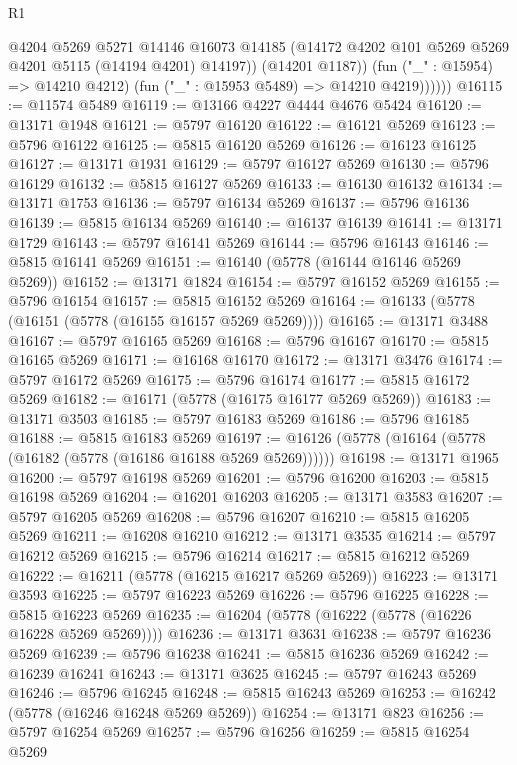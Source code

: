 \begin{lexlean}{R1}
\begin{coremodule}
                  @4204
                  @5269
                  @5271
                  @14146
                  @16073
                  @14185
                  (@14172 @4202 @101 @5269 @5269 @4201 @5115 (@14194 @4201) @14197))
                (@14201 @1187))
              (fun ("_" : @15954) => @14210 @4212)
              (fun ("_" : @15953 @5489) => @14210 @4219))))))
@16115 := @11574 @5489
@16119 := @13166 @4227 @4444 @4676 @5424
@16120 := @13171 @1948
@16121 := @5797 @16120
@16122 := @16121 @5269
@16123 := @5796 @16122
@16125 := @5815 @16120 @5269
@16126 := @16123 @16125
@16127 := @13171 @1931
@16129 := @5797 @16127 @5269
@16130 := @5796 @16129
@16132 := @5815 @16127 @5269
@16133 := @16130 @16132
@16134 := @13171 @1753
@16136 := @5797 @16134 @5269
@16137 := @5796 @16136
@16139 := @5815 @16134 @5269
@16140 := @16137 @16139
@16141 := @13171 @1729
@16143 := @5797 @16141 @5269
@16144 := @5796 @16143
@16146 := @5815 @16141 @5269
@16151 := @16140 (@5778 (@16144 @16146 @5269 @5269))
@16152 := @13171 @1824
@16154 := @5797 @16152 @5269
@16155 := @5796 @16154
@16157 := @5815 @16152 @5269
@16164 := @16133 (@5778 (@16151 (@5778 (@16155 @16157 @5269 @5269))))
@16165 := @13171 @3488
@16167 := @5797 @16165 @5269
@16168 := @5796 @16167
@16170 := @5815 @16165 @5269
@16171 := @16168 @16170
@16172 := @13171 @3476
@16174 := @5797 @16172 @5269
@16175 := @5796 @16174
@16177 := @5815 @16172 @5269
@16182 := @16171 (@5778 (@16175 @16177 @5269 @5269))
@16183 := @13171 @3503
@16185 := @5797 @16183 @5269
@16186 := @5796 @16185
@16188 := @5815 @16183 @5269
@16197 := @16126 (@5778 (@16164 (@5778 (@16182 (@5778 (@16186 @16188 @5269 @5269))))))
@16198 := @13171 @1965
@16200 := @5797 @16198 @5269
@16201 := @5796 @16200
@16203 := @5815 @16198 @5269
@16204 := @16201 @16203
@16205 := @13171 @3583
@16207 := @5797 @16205 @5269
@16208 := @5796 @16207
@16210 := @5815 @16205 @5269
@16211 := @16208 @16210
@16212 := @13171 @3535
@16214 := @5797 @16212 @5269
@16215 := @5796 @16214
@16217 := @5815 @16212 @5269
@16222 := @16211 (@5778 (@16215 @16217 @5269 @5269))
@16223 := @13171 @3593
@16225 := @5797 @16223 @5269
@16226 := @5796 @16225
@16228 := @5815 @16223 @5269
@16235 := @16204 (@5778 (@16222 (@5778 (@16226 @16228 @5269 @5269))))
@16236 := @13171 @3631
@16238 := @5797 @16236 @5269
@16239 := @5796 @16238
@16241 := @5815 @16236 @5269
@16242 := @16239 @16241
@16243 := @13171 @3625
@16245 := @5797 @16243 @5269
@16246 := @5796 @16245
@16248 := @5815 @16243 @5269
@16253 := @16242 (@5778 (@16246 @16248 @5269 @5269))
@16254 := @13171 @823
@16256 := @5797 @16254 @5269
@16257 := @5796 @16256
@16259 := @5815 @16254 @5269

\end{coremodule}
\end{lexlean}
